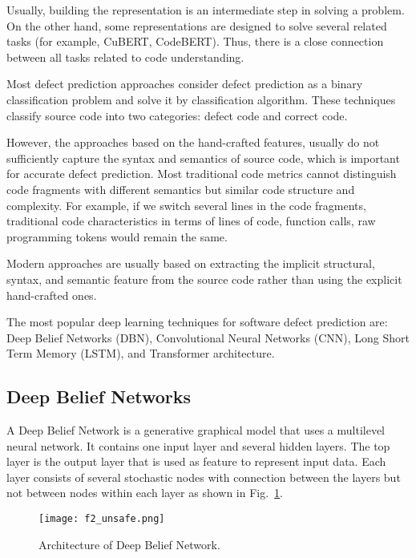 \documentclass{article}
\begin{document}
Usually, building the representation is an intermediate step in solving a problem.
On the other hand, some representations are designed to solve several related tasks (for example, CuBERT, CodeBERT).
Thus, there is a close connection between all tasks related to code understanding.

Most defect prediction approaches consider defect prediction as a binary classification problem and solve it by classification algorithm. These techniques classify source code into two categories: defect code and correct code.

However, the approaches based on the hand-crafted features, usually do not sufficiently capture the syntax and semantics of source code, which is important for accurate defect prediction. Most traditional code metrics cannot distinguish code fragments with different semantics but similar code structure and complexity. For example, if we switch several lines in the code fragments, traditional code characteristics in terms of lines of code, function calls, raw programming tokens would remain the same.

Modern approaches are usually based on extracting the implicit structural, syntax, and semantic feature from the source code rather than using the explicit hand-crafted ones.

The most popular deep learning techniques for software defect prediction are: Deep Belief Networks (DBN), Convolutional Neural Networks (CNN), Long Short Term Memory (LSTM), and Transformer architecture.

\subsection{Deep Belief Networks}

A Deep Belief Network is a generative graphical model that uses a multilevel neural network. It contains one input layer and several hidden layers. The top layer is the output layer that is used as feature to represent input data. Each layer consists of several stochastic nodes with connection between the layers but not between nodes within each layer as shown in Fig.~\ref{fig2}.

\begin{figure}[ht] %
\centering
\texttt{[image: f2\_unsafe.png]}
\caption{ Architecture of Deep Belief Network.}
\label{fig2} %
\end{figure}
\end{document}
